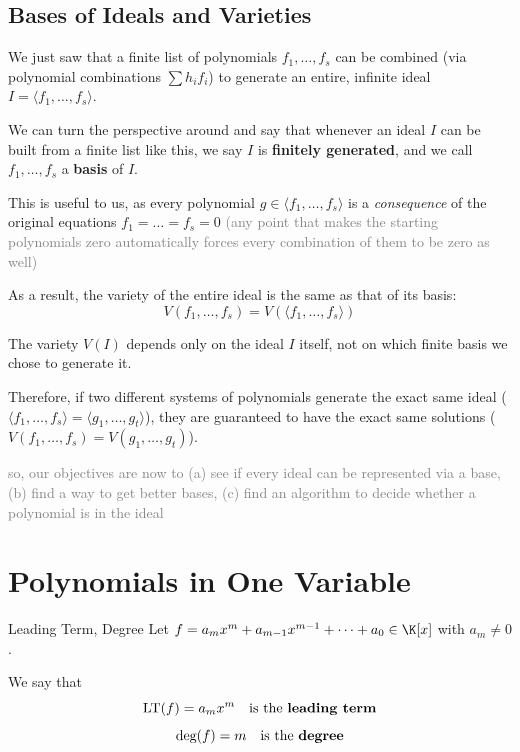 \documentclass[a4paper, 11pt]{report}
\newcommand{\LT}{\operatorname{LT}}
\begin{document}
\subsection{Bases of Ideals and Varieties}
We just saw that a finite list of polynomials $f_1, \dots, f_s$ can be combined (via polynomial combinations $\sum h_i f_i$) to generate an entire, infinite ideal $I = \langle f_1, \dots, f_s \rangle$. 

We can turn the perspective around and say that whenever an ideal $I$ can be built from a finite list like this, we say $I$ is \textbf{finitely generated}, and we call $f_1, \dots, f_s$ a \textbf{basis} of $I$.

This is useful to us, as every polynomial $g \in \langle f_1, \dots, f_s \rangle$ is a \textit{consequence} of the original equations $f_1 = \dots = f_s = 0$ \textcolor{gray}{(any point that makes the starting polynomials zero automatically forces every combination of them to be zero as well)}

\begin{thmframe}{}{}
As a result, the variety of the entire ideal is the same as that of its basis:
$$
V(f_1, \dots, f_s) = V(\langle f_1, \dots, f_s \rangle)$$
\end{thmframe}

\begin{corframe}{}
The variety $V(I)$ depends only on the ideal $I$ itself, not on which finite basis we chose to generate it. 

Therefore, if two different systems of polynomials generate the exact same ideal ($\langle f_1, \dots, f_s \rangle = \langle g_1, \dots, g_t \rangle$), they are guaranteed to have the exact same solutions ($V(f_1, \dots, f_s) = V(g_1, \dots, g_t)$).
\end{corframe}

\textcolor{gray}{so, our objectives are now to (a) see if every ideal can be represented via a base, (b) find a way to get better bases, (c) find an algorithm to decide whether a polynomial is in the ideal}

\section{Polynomials in One Variable}
\begin{defframe}{Leading Term, Degree}{}
    Let $f = a_{m}x^{m}+a_{m-1}x^{m-1}+ \dots + a_{0} \in \K[x]$ with $a_{m} \neq 0$.

    We say that
    $$ \LT(f) = a_{m}x^{m} \quad \text{is the \textbf{leading term}} $$
    $$ \text{deg}(f) = m\quad \text{is the \textbf{degree}} $$
\end{defframe}
\end{document}

